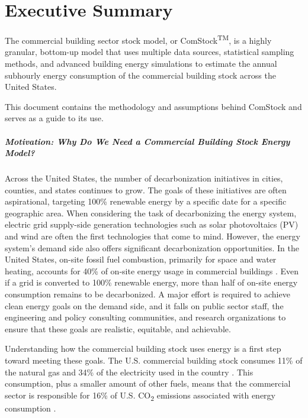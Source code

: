 \chapter{Executive Summary} 
The commercial building sector stock model, or ComStock\textsuperscript{TM}, is a highly granular, bottom-up model that uses multiple data sources, statistical sampling methods, and advanced building energy simulations to estimate the annual subhourly energy consumption of the commercial building stock across the United States.

This document contains the methodology and assumptions behind ComStock and serves as a guide to its use.

\paragraph{Motivation: Why Do We Need a Commercial Building Stock Energy Model?}
Across the United States, the number of decarbonization initiatives in cities, counties, and states continues to grow. The goals of these initiatives are often aspirational, targeting 100\% renewable energy by a specific date for a specific geographic area. When considering the task of decarbonizing the energy system, electric grid supply-side generation technologies such as solar photovoltaics (PV) and wind are often the first technologies that come to mind. However, the energy system's demand side also offers significant decarbonization opportunities. In the United States, on-site fossil fuel combustion, primarily for space and water heating, accounts for 40\% of on-site energy usage in commercial buildings \citep{eia2018cbecs}. Even if a grid is converted to 100\% renewable energy, more than half of on-site energy consumption remains to be decarbonized. A major effort is required to achieve clean energy goals on the demand side, and it falls on public sector staff, the engineering and policy consulting communities, and research organizations to ensure that these goals are realistic, equitable, and achievable.

Understanding how the commercial building stock uses energy is a first step toward meeting these goals. The U.S. commercial building stock consumes 11\% of the natural gas and 34\% of the electricity used in the country \citep{eia_natural_gas}. This consumption, plus a smaller amount of other fuels, means that the commercial sector is responsible for 16\% of U.S. CO\textsubscript{2} emissions associated with energy consumption \citep{eia_emissions_from_energy_consumption}.

